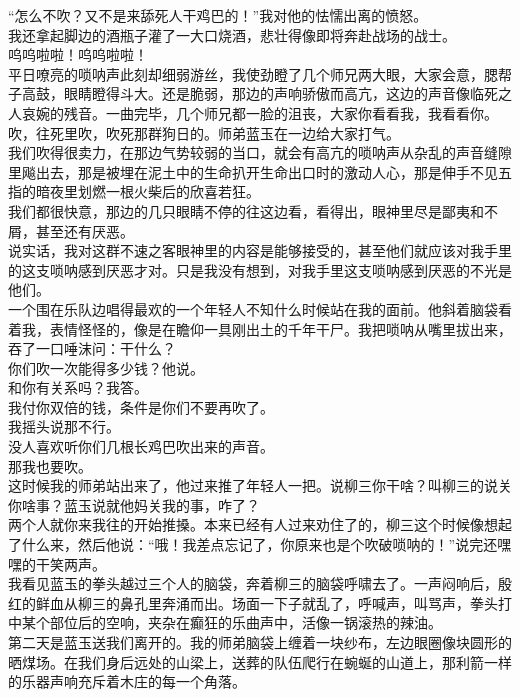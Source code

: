 “怎么不吹？又不是来舔死人干鸡巴的！”我对他的怯懦出离的愤怒。\\

我还拿起脚边的酒瓶子灌了一大口烧酒，悲壮得像即将奔赴战场的战士。\\

呜呜啦啦！呜呜啦啦！\\

平日嘹亮的唢呐声此刻却细弱游丝，我使劲瞪了几个师兄两大眼，大家会意，腮帮子高鼓，眼睛瞪得斗大。还是脆弱，那边的声响骄傲而高亢，这边的声音像临死之人哀婉的残音。一曲完毕，几个师兄都一脸的沮丧，大家你看看我，我看看你。\\

吹，往死里吹，吹死那群狗日的。师弟蓝玉在一边给大家打气。\\

我们吹得很卖力，在那边气势较弱的当口，就会有高亢的唢呐声从杂乱的声音缝隙里飚出去，那是被埋在泥土中的生命扒开生命出口时的激动人心，那是伸手不见五指的暗夜里划燃一根火柴后的欣喜若狂。\\

我们都很快意，那边的几只眼睛不停的往这边看，看得出，眼神里尽是鄙夷和不屑，甚至还有厌恶。\\

说实话，我对这群不速之客眼神里的内容是能够接受的，甚至他们就应该对我手里的这支唢呐感到厌恶才对。只是我没有想到，对我手里这支唢呐感到厌恶的不光是他们。\\

一个围在乐队边唱得最欢的一个年轻人不知什么时候站在我的面前。他斜着脑袋看着我，表情怪怪的，像是在瞻仰一具刚出土的千年干尸。我把唢呐从嘴里拔出来，吞了一口唾沫问：干什么？\\

你们吹一次能得多少钱？他说。\\

和你有关系吗？我答。\\

我付你双倍的钱，条件是你们不要再吹了。\\

我摇头说那不行。\\

没人喜欢听你们几根长鸡巴吹出来的声音。\\

那我也要吹。\\

这时候我的师弟站出来了，他过来推了年轻人一把。说柳三你干啥？叫柳三的说关你啥事？蓝玉说就他妈关我的事，咋了？\\

两个人就你来我往的开始推搡。本来已经有人过来劝住了的，柳三这个时候像想起了什么来，然后他说：“哦！我差点忘记了，你原来也是个吹破唢呐的！”说完还嘿嘿的干笑两声。\\

我看见蓝玉的拳头越过三个人的脑袋，奔着柳三的脑袋呼啸去了。一声闷响后，殷红的鲜血从柳三的鼻孔里奔涌而出。场面一下子就乱了，呼喊声，叫骂声，拳头打中某个部位后的空响，夹杂在癫狂的乐曲声中，活像一锅滚热的辣油。\\

第二天是蓝玉送我们离开的。我的师弟脑袋上缠着一块纱布，左边眼圈像块圆形的晒煤场。在我们身后远处的山梁上，送葬的队伍爬行在蜿蜒的山道上，那利箭一样的乐器声响充斥着木庄的每一个角落。\\
